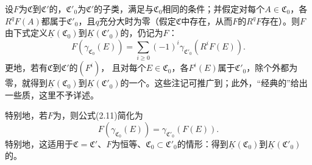 设$F$为$\mathfrak C$到$\mathfrak C'$的，$\mathfrak C'_0$为$\mathfrak C'$的子类，满足与$\mathfrak C_0$相同的条件；并假定对每个$A\in\mathfrak C_0$，各$R^qF(A)$都属于$\mathfrak C'_0$，且$q$充分大时为零（假定$\mathfrak C$中存在，从而$F$的$R^qF$存在）。则$F$由下式定义$\underline K(\mathfrak C_0)$到$\underline K(\mathfrak C'_0)$的，仍记为$F$：
\begin{equation}F(\gamma_{\mathfrak C_0}(E))=\sum_{i\geq0}(-1)^i\gamma_{\mathfrak C'_0}(R^iF(E)).\tag{2.11}\end{equation}
更地，若有$\mathfrak C$到$\mathfrak C'$的$(F^i)$，
且对每个$E\in\mathfrak C_0$，各$F^i(E)$属于$\mathfrak C'_0$，除个外都为零，就得到$\underline K(\mathfrak C_0)$到$\underline K(\mathfrak C'_0)$的一个。这些注记可推广到；此外，“经典的”给出一些质，这里不予详述。

特别地，若$F$为，则公式(2.11)简化为
\begin{equation}F(\gamma_{\mathfrak C_0}(E))=\gamma_{\mathfrak C'_0}(F(E)).\tag{2.11 bis}\end{equation}
特别地，这适用于$\mathfrak C=\mathfrak C'$、$F$为恒等、$\mathfrak C_0\subset\mathfrak C'_0$的情形：得到$\underline K(\mathfrak C_0)$到$\underline K(\mathfrak C'_0)$的。


